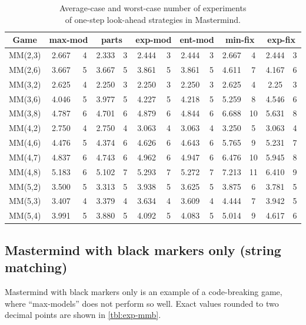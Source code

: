 \begin{table}[ht]
\begin{center}
\begin{tabular}{|c|c|c|c|c|c|c|c|c|c|c|c|c|}\hline
Game & \multicolumn{2}{c|}{max-mod} & \multicolumn{2}{c|}{parts}
& \multicolumn{2}{c|}{exp-mod} & \multicolumn{2}{c|}{ent-mod}
& \multicolumn{2}{c|}{min-fix} & \multicolumn{2}{c|}{exp-fix}\\ \hline
MM(2,3) & 2.667 & 4 & 2.333 & 3 & 2.444 & 3 & 2.444 & 3 & 2.667 & 4 & 2.444 & 3 \\
MM(2,6) & 3.667 & 5 & 3.667 & 5 & 3.861 & 5 & 3.861 & 5 & 4.611 & 7 & 4.167 & 6 \\\hline
MM(3,2) & 2.625 & 4 & 2.250 & 3 & 2.250 & 3 & 2.250 & 3 & 2.625 & 4 & 2.25 &  3 \\
MM(3,6) & 4.046 & 5 & 3.977 & 5 & 4.227 & 5 & 4.218 & 5 & 5.259 & 8 & 4.546 & 6 \\
MM(3,8) & 4.787 & 6 & 4.701 & 6 & 4.879 & 6 & 4.844 & 6 & 6.688 & 10 & 5.631 & 8 \\\hline
MM(4,2) & 2.750 & 4 & 2.750 & 4 & 3.063 & 4 & 3.063 & 4 & 3.250 & 5 & 3.063 & 4 \\
MM(4,6) & 4.476 & 5 & 4.374 & 6 & 4.626 & 6 & 4.643 & 6 & 5.765 & 9 & 5.231 & 7 \\
MM(4,7) & 4.837 & 6 & 4.743 & 6 & 4.962 & 6 & 4.947 & 6 & 6.476 & 10 & 5.945 & 8 \\
MM(4,8) & 5.183 & 6 & 5.102 & 7 & 5.293 & 7 & 5.272 & 7 & 7.213 & 11 & 6.410 & 9 \\\hline
MM(5,2) & 3.500 & 5 & 3.313 & 5 & 3.938 & 5 & 3.625 & 5 & 3.875 & 6 & 3.781 & 5 \\
MM(5,3) & 3.407 & 4 & 3.379 & 4 & 3.634 & 4 & 3.609 & 4 & 4.444 & 7 & 3.942 & 5 \\
MM(5,4) & 3.991 & 5 & 3.880 & 5 & 4.092 & 5 & 4.083 & 5 & 5.014 & 9 & 4.617 & 6 \\\hline
\end{tabular}
\caption{Average-case and worst-case number of experiments\\
  of one-step look-ahead strategies in Mastermind.}
\label{tbl:exp-mm}
\end{center}
\end{table}


\subsection{Mastermind with black markers only (string matching)}

Mastermind with black markers only is an example of a code-breaking game,
  where ``max-models'' does not perform so well.
Exact values rounded to two decimal points are shown in \autoref{tbl:exp-mmb}.


